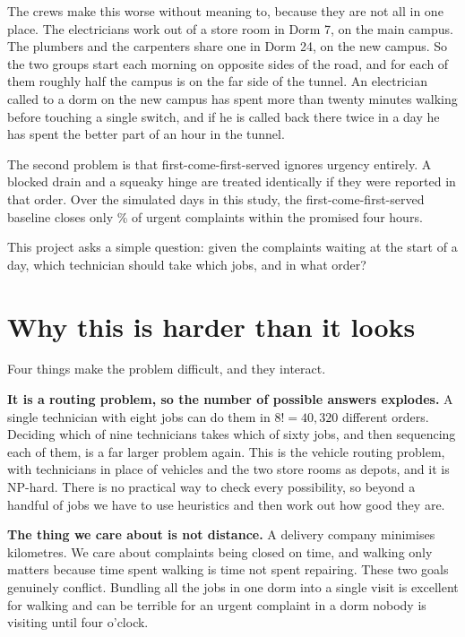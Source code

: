 \documentclass[11pt]{article}
\begin{document}
The crews make this worse without meaning to, because they are not all in one
place. The electricians work out of a store room in Dorm 7, on the main
campus. The plumbers and the carpenters share one in Dorm 24, on the new
campus. So the two groups start each morning on opposite sides of the road,
and for each of them roughly half the campus is on the far side of the
tunnel. An electrician called to a dorm on the new campus has spent more than
twenty minutes walking before touching a single switch, and if he is called
back there twice in a day he has spent the better part of an hour in the
tunnel.

The second problem is that first-come-first-served ignores urgency entirely.
A blocked drain and a squeaky hinge are treated identically if they were
reported in that order. Over the \NDays{} simulated days in this study, the
first-come-first-served baseline closes only \NFifoUrgent\% of urgent
complaints within the promised four hours.

This project asks a simple question: given the complaints waiting at the
start of a day, which technician should take which jobs, and in what order?

\section{Why this is harder than it looks}

Four things make the problem difficult, and they interact.

\textbf{It is a routing problem, so the number of possible answers explodes.}
A single technician with eight jobs can do them in $8! = 40{,}320$ different
orders. Deciding which of nine technicians takes which of sixty jobs, and then
sequencing each of them, is a far larger problem again. This is the vehicle
routing problem, with technicians in place of vehicles and the two store
rooms as depots, and it is NP-hard. There is no practical way to check every
possibility, so beyond a handful of jobs we have to use heuristics and then
work out how good they are.

\textbf{The thing we care about is not distance.} A delivery company
minimises kilometres. We care about complaints being closed on time, and
walking only matters because time spent walking is time not spent repairing.
These two goals genuinely conflict. Bundling all the jobs in one dorm into a
single visit is excellent for walking and can be terrible for an urgent
complaint in a dorm nobody is visiting until four o'clock.
\end{document}
